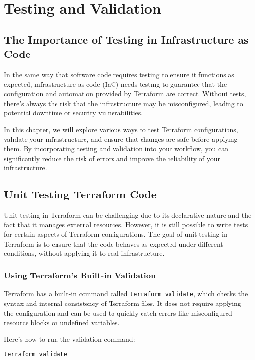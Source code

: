 \chapter{Testing and Validation}
\sloppy

\section{The Importance of Testing in Infrastructure as Code}

In the same way that software code requires testing to ensure it functions as expected, infrastructure as code (IaC) needs testing to guarantee that the configuration and automation provided by Terraform are correct. Without tests, there's always the risk that the infrastructure may be misconfigured, leading to potential downtime or security vulnerabilities.

In this chapter, we will explore various ways to test Terraform configurations, validate your infrastructure, and ensure that changes are safe before applying them. By incorporating testing and validation into your workflow, you can significantly reduce the risk of errors and improve the reliability of your infrastructure.

\section{Unit Testing Terraform Code}

Unit testing in Terraform can be challenging due to its declarative nature and the fact that it manages external resources. However, it is still possible to write tests for certain aspects of Terraform configurations. The goal of unit testing in Terraform is to ensure that the code behaves as expected under different conditions, without applying it to real infrastructure.

\subsection{Using Terraform's Built-in Validation}

Terraform has a built-in command called \texttt{terraform validate}, which checks the syntax and internal consistency of Terraform files. It does not require applying the configuration and can be used to quickly catch errors like misconfigured resource blocks or undefined variables.

Here's how to run the validation command:

\begin{lstlisting}[language=bash]
terraform validate
\end{lstlisting}

